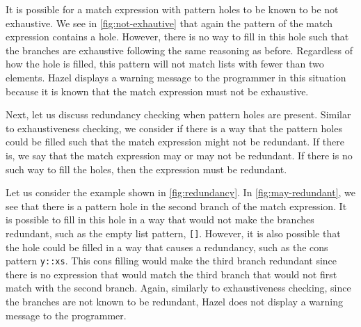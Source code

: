 It is possible for a match expression with pattern holes to be known to be not exhaustive. 
We see in \autoref{fig:not-exhautive} that again the pattern of the match expression contains a hole. 
However, there is no way to fill in this hole such that the branches are exhaustive following the same reasoning as before. Regardless of how the hole is filled, this pattern will not match lists with fewer than two elements. 
Hazel displays a warning message to the programmer in this situation because it is known that the match expression must not be exhaustive.

Next, let us discuss redundancy checking when pattern holes are present. 
Similar to exhaustiveness checking, we consider if there is a way that the pattern holes could be filled such that the match expression might not be redundant. 
If there is, we say that the match expression may or may not be redundant. 
If there is no such way to fill the holes, then the expression must be redundant.

Let us consider the example shown in \autoref{fig:redundancy}. 
In \autoref{fig:may-redundant}, we see that there is a pattern hole in the second branch of the match expression. 
It is possible to fill in this hole in a way that would not make the branches redundant, such as the empty list pattern, \texttt{[]}. 
However, it is also possible that the hole could be filled in a way that causes a redundancy, such as the cons pattern \texttt{y::xs}. 
This cons filling would make the third branch redundant since there is no expression that would match the third branch that would not first match with the second branch.
Again, similarly to exhaustiveness checking, since the branches are not known to be redundant, Hazel does not display a warning message to the programmer.

